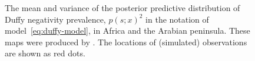 \documentclass[article]{jss}
\begin{document}
\begin{figure}
\begin{center}
    \caption{The mean and variance of the posterior predictive distribution of Duffy negativity prevalence, $p(s;x)^2$ in the notation of model~\ref{eq:duffy-model}, in Africa and the Arabian peninsula. These maps were produced by . The locations of (simulated) observations are shown as red dots.}
    \label{fig:duffymaps}
\end{center}    
\end{figure}

% 
% 
\end{document}
